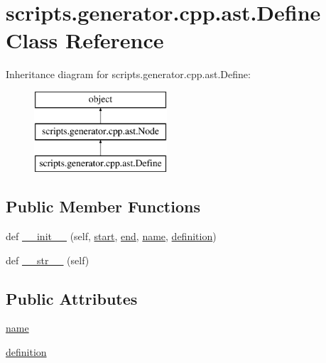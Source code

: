 \hypertarget{classscripts_1_1generator_1_1cpp_1_1ast_1_1_define}{}\section{scripts.\+generator.\+cpp.\+ast.\+Define Class Reference}
\label{classscripts_1_1generator_1_1cpp_1_1ast_1_1_define}
Inheritance diagram for scripts.\+generator.\+cpp.\+ast.\+Define\+:\begin{figure}[H]
\begin{center}
\leavevmode
\includegraphics[height=3.000000cm]{d6/dbe/classscripts_1_1generator_1_1cpp_1_1ast_1_1_define}
\end{center}
\end{figure}
\subsection*{Public Member Functions}
\begin{DoxyCompactItemize}
\item 
def \mbox{\hyperlink{classscripts_1_1generator_1_1cpp_1_1ast_1_1_define_ac4cdc3e792a6d27fa909b8317a905cf1}{\+\_\+\+\_\+init\+\_\+\+\_\+}} (self, \mbox{\hyperlink{classscripts_1_1generator_1_1cpp_1_1ast_1_1_node_a27ce0a583baee598b75ac6dd21f8575b}{start}}, \mbox{\hyperlink{classscripts_1_1generator_1_1cpp_1_1ast_1_1_node_a8e3394f9dd405352610ff9be4f284e2c}{end}}, \mbox{\hyperlink{classscripts_1_1generator_1_1cpp_1_1ast_1_1_define_addce716c7a659f00116fa353bc14bbbb}{name}}, \mbox{\hyperlink{classscripts_1_1generator_1_1cpp_1_1ast_1_1_define_a32fde3b320775b8e16c4373e3ec3e90c}{definition}})
\item 
def \mbox{\hyperlink{classscripts_1_1generator_1_1cpp_1_1ast_1_1_define_af70d29cce44ffa12458d8b4aacb725fc}{\+\_\+\+\_\+str\+\_\+\+\_\+}} (self)
\end{DoxyCompactItemize}
\subsection*{Public Attributes}
\begin{DoxyCompactItemize}
\item 
\mbox{\hyperlink{classscripts_1_1generator_1_1cpp_1_1ast_1_1_define_addce716c7a659f00116fa353bc14bbbb}{name}}
\item 
\mbox{\hyperlink{classscripts_1_1generator_1_1cpp_1_1ast_1_1_define_a32fde3b320775b8e16c4373e3ec3e90c}{definition}}
\end{DoxyCompactItemize}


